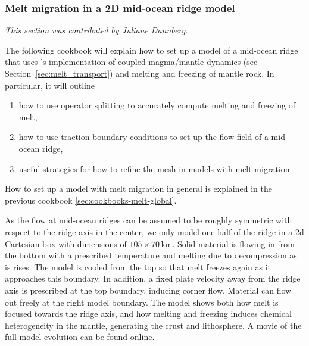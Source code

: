 \subsubsection{Melt migration in a 2D mid-ocean ridge model}
\label{sec:cookbooks-mid-ocean-ridge}

\textit{This section was contributed by Juliane Dannberg.}

The following cookbook will explain how to set up a model of a mid-ocean ridge that uses \aspect{}'s
implementation of coupled magma/mantle dynamics (see Section~\ref{sec:melt_transport}) and melting
and freezing of mantle rock.
In particular, it will outline
\begin{enumerate}
  \item how to use operator splitting to accurately compute melting and freezing of melt,
  \item how to use traction boundary conditions to set up the flow field of a mid-ocean ridge,
  \item useful strategies for how to refine the mesh in models with melt migration.
\end{enumerate}
How to set up a model with melt migration in general is explained in the previous cookbook \ref{sec:cookbooks-melt-global}.

As the flow at mid-ocean ridges can be assumed to be roughly symmetric with respect to the ridge axis
in the center, we only model one half of the ridge in a 2d Cartesian box with dimensions of $105 \times 70$\,km. Solid material is flowing in from the bottom with a prescribed temperature and melting due to decompression as is rises. The model is cooled from the top so that melt freezes again as it approaches this boundary. In addition, a fixed plate velocity away from the ridge axis is prescribed at the top boundary, inducing corner flow. Material can flow out freely at the right model boundary. The model shows both how melt is focused towards the ridge axis, and how melting and freezing induces chemical heterogeneity in the mantle, generating the crust and lithosphere.
A movie of the full model evolution can be found \href{https://www.youtube.com/watch?v=f4Bc4lzdNP0}{online}.

